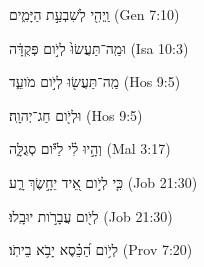 
\begin{exe}

\ex\label{Lday_sim1}
\texthebrew{
וַֽיְהִ֖י לְשִׁבְעַ֣ת הַיָּמִ֑ים 
} (Gen 7:10)

\ex\label{Lday_sim2}
\texthebrew{
וּמַֽה־תַּעֲשׂוּ֙ לְיֹ֣ום פְּקֻדָּ֔ה 
} (Isa 10:3)

\ex\label{Lday_sim3}
\texthebrew{
מַֽה־תַּעֲשׂ֖וּ לְיֹ֣ום מֹועֵ֑ד 
} (Hos 9:5)

\ex\label{Lday_sim4}
\texthebrew{
וּלְיֹ֖ום חַג־יְהוָֽה׃ 
} (Hos 9:5)

\ex\label{Lday_sim5}
\texthebrew{
וְהָ֣יוּ לִ֗י לַיֹּ֕ום סְגֻלָּ֑ה 
} (Mal 3:17)

\ex\label{Lday_sim6}
\texthebrew{
כִּ֤י לְיֹ֣ום אֵ֭יד יֵחָ֣שֶׂךְ רָ֑ע 
} (Job 21:30)

\ex\label{Lday_sim7}
\texthebrew{
לְיֹ֖ום עֲבָרֹ֣ות יוּבָֽלוּ׃ 
} (Job 21:30)

\ex\label{Lday_sim8}
\texthebrew{
לְיֹ֥ום הַ֝כֵּ֗סֶא יָבֹ֥א בֵיתֹֽו׃ 
} (Prov 7:20)

\end{exe}

